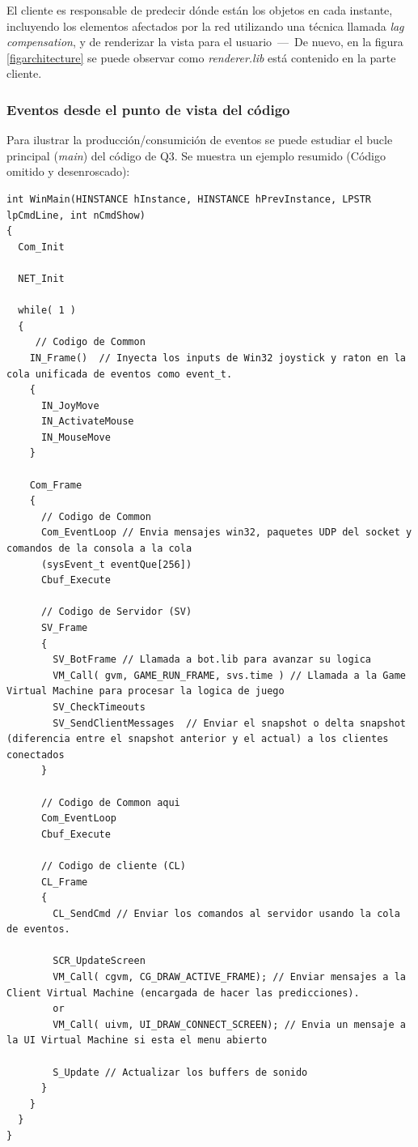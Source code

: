 \documentclass[a4paper,12pt]{report}
\begin{document}
	El cliente es responsable de predecir dónde están los objetos en cada instante, incluyendo los elementos afectados por la red utilizando una técnica llamada \textit{lag compensation}, y de renderizar la vista para el usuario \,---\, De nuevo, en la figura  \ref{figarchitecture} se puede observar como \textit{renderer.lib} está contenido en la parte cliente. \cite{architecture}\\
	
	\newpage
	
	\subsubsection{Eventos desde el punto de vista del código}
	
	Para ilustrar la producción/consumición de eventos se puede estudiar el bucle principal (\textit{main}) del código de Q3. Se muestra un ejemplo resumido (Código omitido y desenroscado):
	
	\begin{lstlisting}[style=C, numbers=none]
int WinMain(HINSTANCE hInstance, HINSTANCE hPrevInstance, LPSTR lpCmdLine, int nCmdShow)
{
  Com_Init
	
  NET_Init
	
  while( 1 )
  {
     // Codigo de Common 
    IN_Frame()  // Inyecta los inputs de Win32 joystick y raton en la cola unificada de eventos como event_t.
    {
      IN_JoyMove
      IN_ActivateMouse
      IN_MouseMove
    }
    
    Com_Frame
    {
      // Codigo de Common 
      Com_EventLoop // Envia mensajes win32, paquetes UDP del socket y comandos de la consola a la cola
      (sysEvent_t eventQue[256])
      Cbuf_Execute
      
      // Codigo de Servidor (SV)
      SV_Frame
      {
        SV_BotFrame // Llamada a bot.lib para avanzar su logica
        VM_Call( gvm, GAME_RUN_FRAME, svs.time ) // Llamada a la Game Virtual Machine para procesar la logica de juego
        SV_CheckTimeouts
        SV_SendClientMessages  // Enviar el snapshot o delta snapshot (diferencia entre el snapshot anterior y el actual) a los clientes conectados
      } 
      
      // Codigo de Common aqui
      Com_EventLoop
      Cbuf_Execute
      
      // Codigo de cliente (CL)
      CL_Frame
      {
        CL_SendCmd // Enviar los comandos al servidor usando la cola de eventos.
        
        SCR_UpdateScreen
        VM_Call( cgvm, CG_DRAW_ACTIVE_FRAME); // Enviar mensajes a la Client Virtual Machine (encargada de hacer las predicciones).
        or
        VM_Call( uivm, UI_DRAW_CONNECT_SCREEN); // Envia un mensaje a la UI Virtual Machine si esta el menu abierto
        
        S_Update // Actualizar los buffers de sonido
      }
    }
  }
}
	\end{lstlisting}
\end{document}
